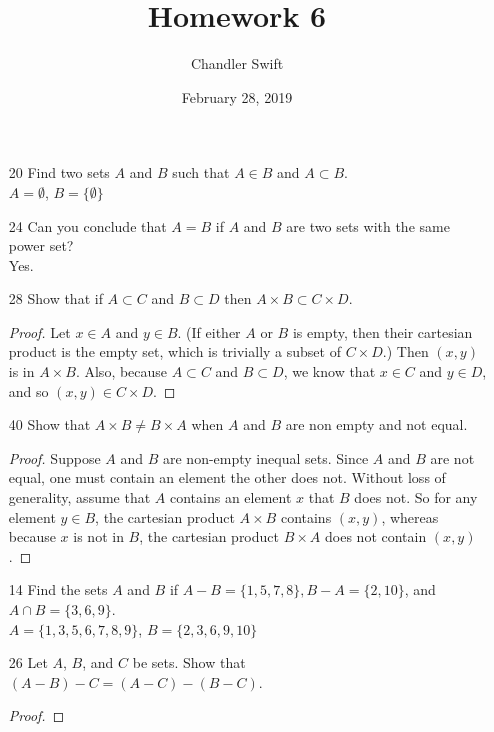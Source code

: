 \documentclass{article}
\title{Homework 6}
\author{Chandler Swift}
\date{February 28, 2019}
\begin{document}
\maketitle
\begin{itemize}
  \item[20] Find two sets $A$ and $B$ such that $A \in B$ and $A \subset B$.\\
    $A = \emptyset$, $B = \{ \emptyset \}$
  \item[24] Can you conclude that $A=B$ if $A$ and $B$ are two sets with
    the same power set? \\
    Yes. 
  \item[28] Show that if $A \subset C$ and $B \subset D$ then $A \times B \subset C \times D$.
    \begin{proof}
      Let $x \in A$ and $y \in B$. (If either $A$ or $B$ is empty, then their
      cartesian product is the empty set, which is trivially a subset of $C \times D$.)
      Then $(x,y)$ is in $A \times B$. Also, because $A \subset C$ and $B \subset D$, 
      we know that $x \in C$ and $y \in D$, and so $(x,y) \in C \times D$.
    \end{proof}
  \item[40] Show that $A \times B \neq B \times A$ when $A$ and $B$ are non empty and not equal.
    \begin{proof}
      Suppose $A$ and $B$ are non-empty inequal sets. Since $A$ and $B$ are not
      equal, one must contain an element the other does not. Without loss of
      generality, assume that $A$ contains an element $x$ that $B$ does not. So
      for any element $y \in B$, the cartesian product $A \times B$ contains
      $(x,y)$, whereas because $x$ is not in $B$, the cartesian product
      $B \times A$ does not contain $(x,y)$. 
    \end{proof}

    \hrulefill

  \item[14] Find the sets $A$ and $B$ if $A-B = \{1,5,7,8\}, B-A=\{2,10\}$, and
    $A \cap B = \{3,6,9\}$.\\
    $A=\{1,3,5,6,7,8,9\}$, $B=\{2,3,6,9,10\}$
  \item[26] Let $A$, $B$, and $C$ be sets. Show that $(A-B)-C=(A-C)-(B-C)$.
    \begin{proof}


\end{proof}
\end{itemize}
\end{document}
